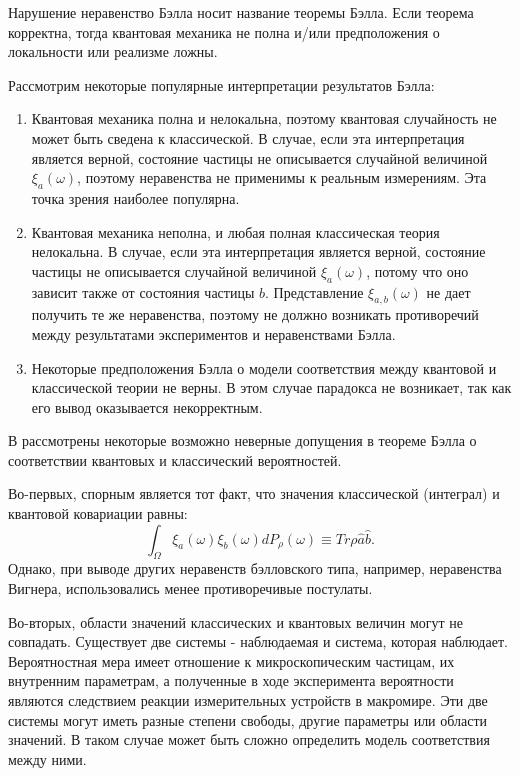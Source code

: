 \documentclass[%
master,         %
subf,           %
href,           %
,times         %
]{disser}
\numberwithin{equation}{section}
\numberwithin{figure}{section}
\begin{document}
Нарушение неравенство Бэлла носит название теоремы Бэлла. Если теорема корректна, тогда квантовая механика не полна и/или предположения о локальности или реализме ложны. 

Рассмотрим некоторые популярные интерпретации результатов Бэлла:
\begin{enumerate}
\item Квантовая механика полна и нелокальна, поэтому квантовая случайность не может быть сведена к классической. 
В случае, если эта интерпретация является верной, состояние частицы не описывается случайной величиной $\xi_a(\omega)$, поэтому неравенства не применимы к реальным измерениям. Эта точка зрения наиболее популярна.

\item Квантовая механика неполна, и любая полная классическая теория нелокальна. 
В случае, если эта интерпретация является верной, состояние частицы не описывается случайной величиной $\xi_a(\omega)$, потому что оно зависит также от состояния частицы $b$. Представление $\xi_{a,b}(\omega)$ не дает получить те же неравенства, поэтому не должно возникать противоречий между результатами экспериментов и неравенствами Бэлла.

\item Некоторые предположения Бэлла о модели соответствия между квантовой и классической теории не верны. В этом случае парадокса не возникает, так как его вывод оказывается некорректным. 
\end{enumerate}

В \cite{Khrennikov_information} рассмотрены некоторые возможно неверные допущения в теореме Бэлла о соответствии квантовых и классический вероятностей.

Во-первых, спорным является тот факт, что значения классической (интеграл) и квантовой ковариации равны:
$$\int_\Omega\xi_a(\omega)\xi_b(\omega)dP_\rho(\omega) \equiv Tr\rho\hat{a}\hat{b}.$$
Однако, при выводе других неравенств бэлловского типа, например, неравенства Вигнера, использовались менее противоречивые постулаты.

Во-вторых, области значений классических и квантовых величин могут не совпадать. Существует две системы - наблюдаемая и система, которая наблюдает. Вероятностная мера имеет отношение к микроскопическим частицам, их внутренним параметрам, а полученные в ходе эксперимента вероятности являются следствием реакции измерительных устройств в макромире. Эти две системы могут иметь разные степени свободы, другие параметры или области значений. В таком случае может быть сложно определить модель соответствия между ними.
\end{document}
